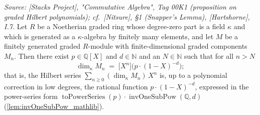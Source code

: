 \begin{lemma}\leanok
  \label{lem:gradedHilbertSerre_rational}
  \textit{Source: [Stacks Project], "Commutative Algebra", Tag 00K1
  (proposition on graded Hilbert polynomials); cf.\ [Nitsure], \S 1 (Snapper's
  Lemma), [Hartshorne], I.7.}
  Let \(R\) be a Noetherian graded ring whose degree-zero part is a field
  \(\kappa\) and which is generated as a \(\kappa\)-algebra by finitely many
  elements, and let \(M\) be a finitely generated graded \(R\)-module with
  finite-dimensional graded components \(M_n\). Then there exist
  \(p \in \mathbb{Q}[X]\) and \(d \in \mathbb{N}\) and an \(N \in \mathbb{N}\)
  such that for all \(n > N\)
  \[
    \dim_{\kappa} M_n \;=\; \bigl[ X^n \bigr]\bigl( p \cdot (1 - X)^{-d}\bigr);
  \]
  that is, the Hilbert series \(\sum_{n \ge 0} (\dim_\kappa M_n)\, X^n\) is, up to
  a polynomial correction in low degrees, the rational function
  \(p \cdot (1 - X)^{-d}\), expressed in the power-series form
  \(\operatorname{toPowerSeries}(p) \cdot \operatorname{invOneSubPow}(\mathbb{Q}, d)\)
  (\cref{lem:invOneSubPow_mathlib}).


\end{lemma}
